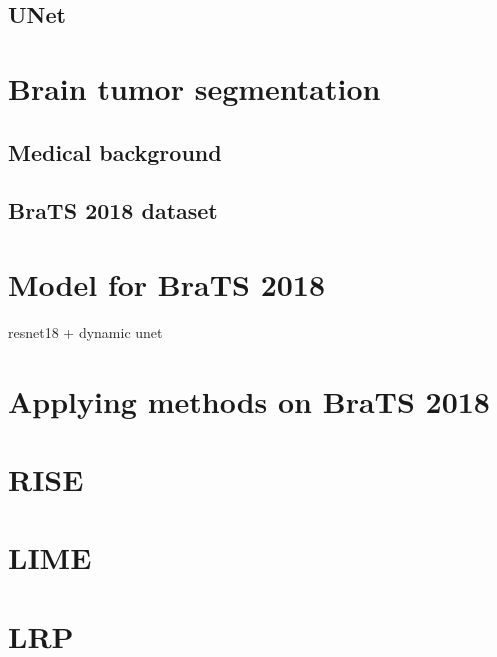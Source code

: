 \documentclass[
	a4paper,					%
	10pt,							%
	oneside,					%
	openright,				%
	notitlepage,			%
	parskip=half,			%
]{scrreprt}					%
\begin{document}
\section{UNet}




\chapter{Brain tumor segmentation}
\section{Medical background}
\section{BraTS 2018 dataset}

\chapter{Model for BraTS 2018}
resnet18 + dynamic unet

\chapter{Applying methods on BraTS 2018}
\chapter{RISE}
\chapter{LIME}
\chapter{LRP}

{}



\cleardoublepage
{} 
{}


\end{document}

